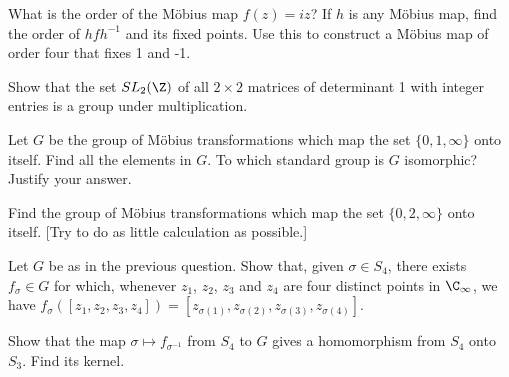 \begin{solution}[\bf Solution.]

\end{solution}

\begin{problem}What is the order of the M\"obius map $f(z) = iz$? If $h$ is any M\"obius map, find the order of $h f h^{-1}$ and its fixed points. Use this to construct a M\"obius map of order four that fixes 1 and -1.

\end{problem} 

\begin{solution}[\bf Solution.]

\end{solution}


\begin{problem}Show that the set $SL_2(\Z)$ of all $2 \times 2$ matrices of determinant 1 with integer entries is a group under multiplication.

\end{problem} 

\begin{solution}[\bf Solution.]

\end{solution}

\begin{problem}Let $G$ be the group of M\"obius transformations which map the set $\{0, 1,\infty\}$ onto itself. Find all the elements in $G$. To which standard group is $G$ isomorphic? Justify your answer.

Find the group of M\"obius transformations which map the set $\{0, 2,\infty\}$ onto itself. [Try to do as little calculation as possible.]

\end{problem} 

\begin{solution}[\bf Solution.]


\end{solution}

\begin{problem}Let $G$ be as in the previous question. Show that, given $\sigma\in S_4$, there exists $f_\sigma \in G$ for which, whenever $z_1$, $z_2$, $z_3$ and $z_4$ are four distinct points in $\C_\infty$, we have $f_\sigma([z_1, z_2, z_3, z_4]) = [z_{\sigma(1)}, z_{\sigma(2)}, z_{\sigma(3)}, z_{\sigma(4)}]$.

Show that the map $\sigma \mapsto f_{\sigma^{-1}}$ from $S_4$ to $G$ gives a homomorphism from $S_4$ onto $S_3$. Find its kernel.

\end{problem} 

